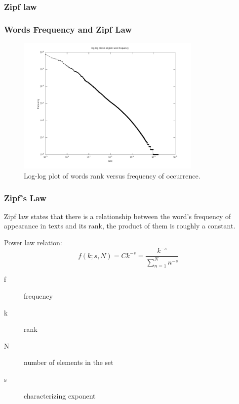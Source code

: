 \documentclass{beamer}
\begin{document}
\subsubsection{Zipf law}
\frame
{
  \frametitle{Words Frequency and Zipf Law}
  \vspace{-0.25cm}
  \begin{figure}[h!]
  \centering
  \includegraphics[width=0.8\textwidth]{images/wordfrequency_en.png}
  \vspace{-0.6cm}
  \caption{Log-log plot of words rank versus frequency of occurrence.}
  \label{fig:wordfrequency_en}
  \end{figure} 
}

\frame
{
  \frametitle{Zipf's Law}

 Zipf law states that there is a relationship between the word's frequency of appearance in texts and its rank, the product of them is roughly a constant.
 
 Power law relation: 
 \begin{equation}
 f(k;s,N) = Ck^{-s} = \frac{k^{-s}}{\sum_{n=1}^{N} n^{-s}}
 \end{equation}

 \begin{description}
 \item[f] frequency
 \item[k] rank
 \item[N] number of elements in the set
 \item[s] characterizing exponent
 \end{description}

}
\end{document}
